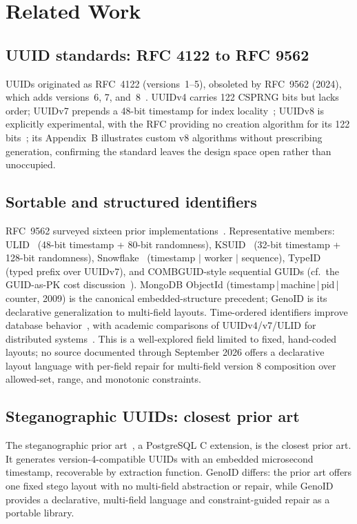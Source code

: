 \documentclass{svproc}
\begin{document}
\section{Related Work}
\label{sec:related-work}
\subsection{UUID standards: RFC 4122 to RFC 9562}
UUIDs originated as RFC~4122 (versions~1--5), obsoleted by RFC~9562 (2024), which adds versions~6, 7, and~8~\cite{4}. UUIDv4 carries 122 CSPRNG bits but lacks order; UUIDv7 prepends a 48-bit timestamp for index locality~\cite[\S5.7]{4}; UUIDv8 is explicitly experimental, with the RFC providing no creation algorithm for its 122 bits~\cite[\S5.8]{4}; its Appendix~B illustrates custom v8 algorithms without prescribing generation, confirming the standard leaves the design space open rather than unoccupied.
\subsection{Sortable and structured identifiers}
RFC~9562 surveyed sixteen prior implementations~\cite{4}. Representative members: ULID~\cite{5} (48-bit timestamp + 80-bit randomness), KSUID~\cite{6} (32-bit timestamp + 128-bit randomness), Snowflake~\cite{7} (timestamp $|$ worker $|$ sequence), TypeID~\cite{8} (typed prefix over UUIDv7), and COMBGUID-style sequential GUIDs (cf.\ the GUID-as-PK cost discussion~\cite{9}). MongoDB ObjectId (timestamp\,|\,machine\,|\,pid\,|\,counter, 2009) is the canonical embedded-structure precedent; GenoID is its declarative generalization to multi-field layouts. Time-ordered identifiers improve database behavior~\cite{9}, with academic comparisons of UUIDv4/v7/ULID for distributed systems~\cite{10}. This is a well-explored field limited to fixed, hand-coded layouts; no source documented through September 2026 offers a declarative layout language with per-field repair for multi-field version 8 composition over allowed-set, range, and monotonic constraints.
\subsection{Steganographic UUIDs: closest prior art}
The steganographic prior art~\cite{11}, a PostgreSQL C extension, is the closest prior art. It generates version-4-compatible UUIDs with an embedded microsecond timestamp, recoverable by extraction function. GenoID differs: the prior art offers one fixed stego layout with no multi-field abstraction or repair, while GenoID provides a declarative, multi-field language and constraint-guided repair as a portable library.
\end{document}
